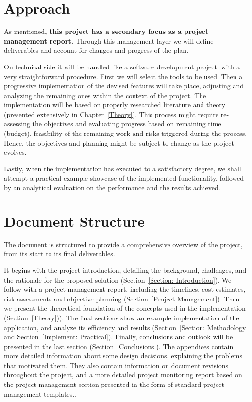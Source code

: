 \documentclass[a4paper, 11pt]{report}
\begin{document}
\section{Approach}
As mentioned\textbf{, this project has a secondary focus as a project management report.} Through this management layer we will define deliverables and account for changes and progress of the plan.

On technical side it will be handled like a software development project, with a very straightforward procedure. First we will select the tools to be used. Then a progressive implementation of the devised features will take place, adjusting and analyzing the remaining ones within the context of the project. The implementation will be based on properly researched literature and theory (presented extensively in Chapter~\ref{Theory}). This process might require re-assessing the objectives and evaluating progress based on remaining time (budget), feasibility of the remaining work and risks triggered during the process. Hence, the objectives and planning might be subject to change as the project evolves.

Lastly, when the implementation has executed to a satisfactory degree, we shall attempt a practical example showcase of the implemented functionality, followed by an analytical evaluation on the performance and the results achieved.

\section{Document Structure}
The document is structured to provide a comprehensive overview of the project, from its start to its final deliverables.

It begins with the project introduction, detailing the background, challenges, and the rationale for the proposed solution (Section~\ref{Section: Introduction}).
We follow with a project management report, including the timelines, cost estimates, risk assessments and objective planning (Section~\ref{Project Management}).
Then we present the theoretical foundation of the concepts used in the implementation (Section~\ref{Theory})).
The final sections show an example implementation of the application, and analyze its efficiency and results (Section~\ref{Section: Methodology} and Section~\ref{Implement: Practical}).
Finally, conclusions and outlook will be presented in the last section (Section~\ref{Conclusions}).
The appendices contain more detailed information about some design decisions, explaining the problems that motivated them. They also contain information on document revisions throughout the project, and a more detailed project monitoring report based on the project management section presented in the form of standard project management templates..
\end{document}

